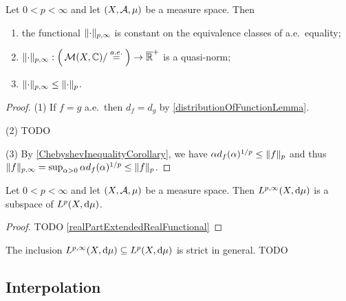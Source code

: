 \begin{proposition}
Let $0<p<\infty$ and let $\left( X,\mathcal{A}, \mu \right)$ be a measure space. Then
\begin{enumerate}
\item the functional $\lVert\cdot\rVert_{p,\infty}$ is constant on the equivalence classes of a.e.\ equality;
\item $\lVert\cdot\rVert_{p,\infty}: \Big(\operatorname{\mathcal{M}}(X, \mathbb{C})/\overset{a.e.}{=}\Big) \to \overline{\mathbb{R}}^+$ is a quasi-norm;
\item $\lVert\cdot\rVert_{p,\infty} \leq \lVert\cdot\rVert_{p}$.
\end{enumerate}
\end{proposition}
\begin{proof}
(1) If $f = g$ a.e.\ then $d_f = d_g$ by \ref{distributionOfFunctionLemma}.

(2) TODO

(3) By \ref{ChebyshevInequalityCorollary}, we have $\alpha d_f(\alpha)^{1/p} \leq \lVert f\rVert_p$ and thus $\lVert f\rVert_{p,\infty} = \sup_{\alpha > 0}\alpha d_f(\alpha)^{1/p} \leq \lVert f\rVert_p$.
\end{proof}
\begin{corollary}
Let $0<p<\infty$ and let $\left( X,\mathcal{A}, \mu \right)$ be a measure space. Then $L^{p,\infty}(X,\operatorname{d \!}{\mu})$ is a subspace of $L^{p}(X,\operatorname{d \!}{\mu})$.
\end{corollary}
\begin{proof}
TODO \ref{realPartExtendedRealFunctional}
\end{proof}

\begin{example}
The inclusion $L^{p,\infty}(X,\operatorname{d \!}{\mu}) \subseteq L^{p}(X,\operatorname{d \!}{\mu})$ is strict in general. TODO
\end{example}

\subsection{Interpolation}

